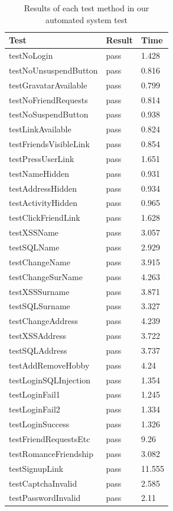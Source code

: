 \documentclass[a4paper]{article}
\begin{document}
\begin{table}[h!]
\begin{tabular}{| l | l | l |}
\hline
\textbf{Test} & \textbf{Result} & \textbf{Time} \\
\hline
testNoLogin &			 pass & 1.428  \\ \hline
testNoUnsuspendButton &  pass & 0.816  \\ \hline
testGravatarAvailable &  pass & 0.799  \\ \hline
testNoFriendRequests &   pass & 0.814  \\ \hline
testNoSuspendButton &    pass & 0.938  \\ \hline
testLinkAvailable &      pass & 0.824  \\ \hline
testFriendsVisibleLink & pass & 0.854  \\ \hline
testPressUserLink &      pass & 1.651  \\ \hline
testNameHidden &         pass & 0.931  \\ \hline
testAddressHidden &      pass & 0.934  \\ \hline
testActivityHidden &     pass & 0.965  \\ \hline
testClickFriendLink &    pass & 1.628  \\ \hline
testXSSName &            pass & 3.057  \\ \hline
testSQLName &            pass & 2.929  \\ \hline
testChangeName &         pass & 3.915  \\ \hline
testChangeSurName &      pass & 4.263  \\ \hline
testXSSSurname &         pass & 3.871  \\ \hline
testSQLSurname &         pass & 3.327  \\ \hline
testChangeAddress &      pass & 4.239  \\ \hline
testXSSAddress &         pass & 3.722  \\ \hline
testSQLAddress &         pass & 3.737  \\ \hline
testAddRemoveHobby &     pass & 4.24   \\ \hline
testLoginSQLInjection &  pass & 1.354  \\ \hline
testLoginFail1 &         pass & 1.245  \\ \hline
testLoginFail2 &         pass & 1.334  \\ \hline
testLoginSuccess &       pass & 1.326  \\ \hline
testFriendRequestsEtc &  pass & 9.26   \\ \hline
testRomanceFriendship &  pass & 3.082  \\ \hline
testSignupLink &         pass & 11.555 \\ \hline
testCaptchaInvalid &     pass & 2.585  \\ \hline
testPasswordInvalid &    pass & 2.11   \\ \hline
\end{tabular}
\caption{Results of each test method in our automated system test}
\label{tab:test_results}
\end{table}
\end{document}
